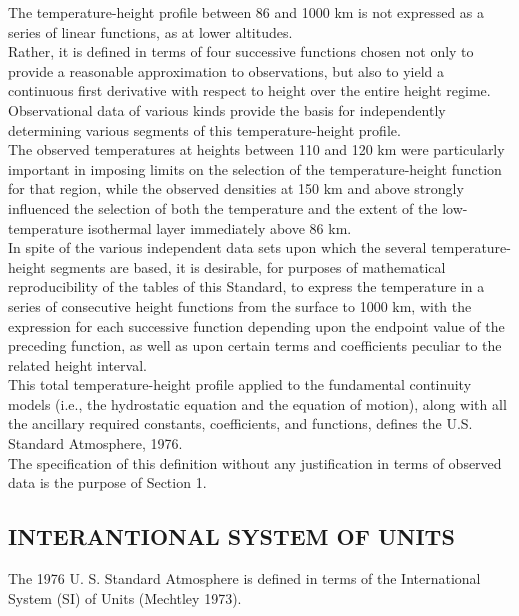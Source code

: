 \documentclass{article}
\begin{document}
The temperature-height profile between 86 and 1000 km is not expressed as a series of linear functions, as at lower altitudes.\\

Rather, it is defined in terms of four successive functions chosen not only to provide a reasonable approximation to observations, but also to yield a continuous first derivative with respect to height over the entire height regime.\\

Observational data of various kinds provide the basis for independently determining various segments of this temperature-height profile.\\
The observed temperatures at heights between 110 and 120 km were particularly important in imposing limits on the selection of the temperature-height function for that region, while the observed densities at 150 km and above strongly influenced the selection of both the temperature and the extent of the low-temperature isothermal layer immediately above 86 km.\\

In spite of the various independent data sets upon which the several temperature-height segments are based, it is desirable, for purposes of mathematical reproducibility of the tables of this Standard, to express the temperature in a series of consecutive height functions from the surface to 1000 km, with the expression for each successive function depending upon the endpoint value of the preceding function, as well as upon certain terms and coefficients peculiar to the related height interval.\\

This total temperature-height profile applied to the fundamental continuity models (i.e., the hydrostatic equation and the equation of motion), along with all the ancillary required constants, coefficients, and functions, defines the U.S. Standard Atmosphere, 1976.\\
The specification of this definition without any justification in terms of observed data is the purpose of Section 1.\\

\subsection{INTERANTIONAL SYSTEM OF UNITS}

The 1976 U. S. Standard Atmosphere is defined in terms of the International System (SI) of Units (Mechtley 1973). \\
\end{document}
